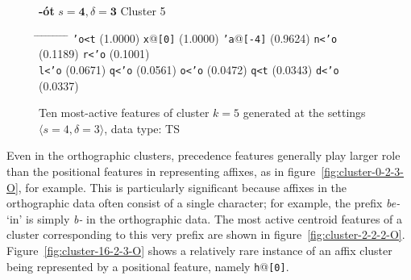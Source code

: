 \begin{figure}[ht] 
\begin{mdframed}
{\LARGE \textbf{-\'ot}} \hfill {\large$s=\textbf{4}, \delta=\textbf{3}$} \hfill Cluster 5\\
\vspace{-10pt}
\begin{normalsize}
\begin{tabbing}
\hspace{6ex} \= \hspace{9.5ex} \= \hspace{7ex} \= \hspace{10ex} \= \hspace{7ex} \= \hspace{10ex} \= \hspace{5ex} \= \hspace{9.5ex} \= \hspace{5ex} \= \hspace{8ex} \kill
\texttt{\a'{o}<t} \> (1.0000) \> \texttt{x}@\texttt{[0]} \> (1.0000) \> \texttt{\a'{a}}@\texttt{[-4]} \> (0.9624) \> \texttt{n<\a'{o}} \> (0.1189) \> \texttt{r<\a'{o}} \> (0.1001) \\
 \texttt{l<\a'{o}} \> (0.0671) \> \texttt{q<\a'{o}} \> (0.0561) \> \texttt{o<\a'{o}} \> (0.0472) \> \texttt{q<t} \> (0.0343) \> \texttt{d<\a'{o}} \> (0.0337)
 \end{tabbing}
 \end{normalsize}
\label{fig:cluster-5-4-3-TS}
\caption{Ten most-active features of cluster $k = 5$ generated at the settings $\langle{s}=4,\delta=3\rangle$, data type: TS}
\end{mdframed}
\end{figure}
Even in the orthographic clusters, precedence features generally play larger role than the positional features in representing affixes, 
as in figure~\ref{fig:cluster-0-2-3-O}, for example. 
This is particularly significant because affixes in the orthographic data often consist of a single character; for example, the prefix \textit{be-} `in' is simply \textit{b-} in the orthographic data. The most active centroid features of a cluster corresponding to this very prefix are shown in figure~\ref{fig:cluster-2-2-2-O}. Figure~\ref{fig:cluster-16-2-3-O} shows a relatively rare instance of an affix cluster being represented by a positional feature, namely  \texttt{h}@\texttt{[0]}.
